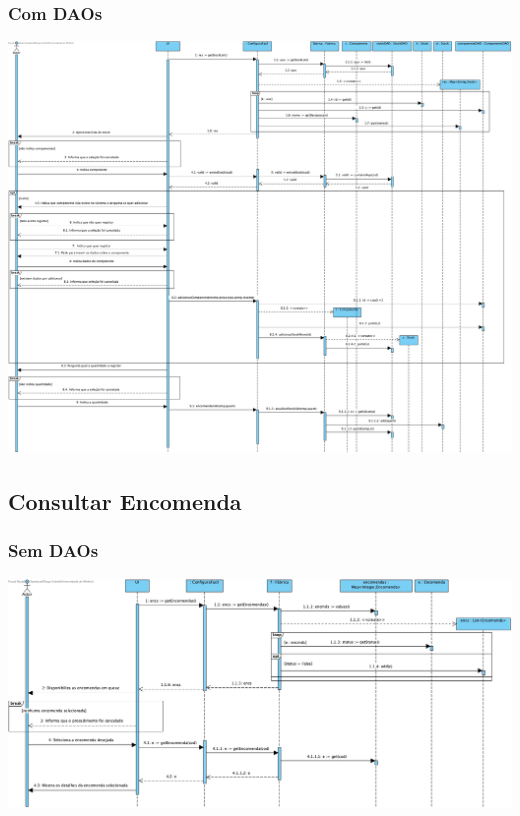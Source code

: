 \subsubsection{Com DAOs}
\begin{center}
 	\includegraphics[width = 5.5in]{DSI_D/DSI-DAOs-Registar_Stock.jpg}
\end{center}


\subsection{Consultar Encomenda}
\subsubsection{Sem DAOs}
\begin{center}
 	\includegraphics[width = 5.5in]{DSI/DSI-Consultar_Encomenda.jpg}
\end{center}
